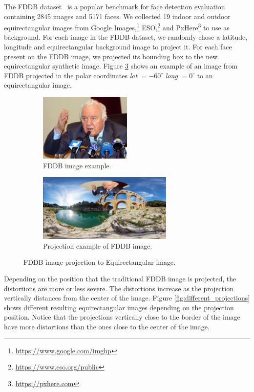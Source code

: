 The FDDB dataset~\cite{jain2010fddb} is a popular benchmark for face detection evaluation containing 2845 images and 5171 faces. We collected 19 indoor and outdoor equirectangular images from Google Images,\footnote{\url{https://www.google.com/imghp}} ESO,\footnote{\url{https://www.eso.org/public}} and PxHere\footnote{\url{https://pxhere.com}} to use as background.
For each image in the FDDB dataset, we randomly chose a latitude, longitude and equirectangular background image to project it.
For each face present on the FDDB image, we projected its bounding box to the new equirectangular synthetic image. Figure \ref{fig:authoring_fddb_proj} shows an example of an image from FDDB projected in the polar coordinates \emph{lat} $ = -60^{\circ}$ \emph{long} $ = 0^{\circ}$ to an equirectangular image.

\begin{figure}[!ht]
\centering
    \begin{subfigure}{0.4\linewidth}
        \centering
        \includegraphics[height=9em]{img/video360/face_pre.png}
        \caption{FDDB image example.}
        \label{subfig:face_pre}
    \end{subfigure}\hfill
    \begin{subfigure}{0.55\linewidth}
        \centering
         \includegraphics[height=9em]{img/video360/face_pos.png}
        \caption{Projection example of FDDB image.}
        \label{subfig:face_pos}
    \end{subfigure}

\caption{FDDB image projection to Equirectangular image.}
\label{fig:authoring_fddb_proj}
\end{figure}

Depending on the position that the traditional FDDB image is projected, the distortions are more or less severe. The distortions increase as the projection vertically distances from the center of the image. Figure \ref{fig:different_projections} shows different resulting equirectangular images depending on the projection position. Notice that the projections vertically close to the border of the image have more distortions than the ones close to the center of the image.

